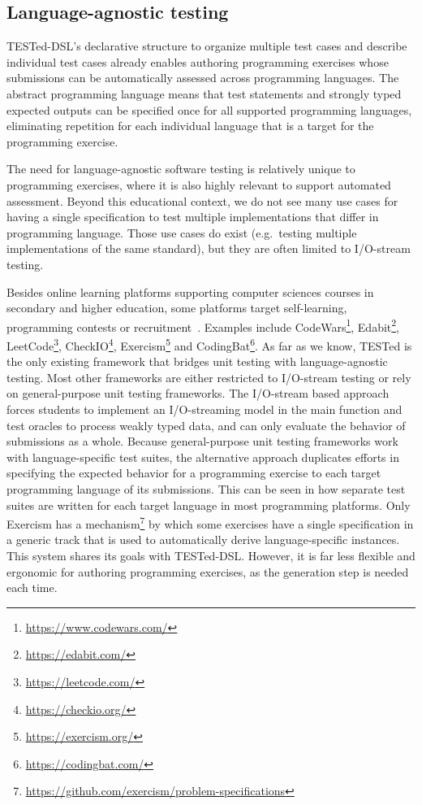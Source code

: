 \documentclass[../main]{subfiles}
\begin{document}
\subsection{Language-agnostic testing}\label{subsec:language-agnostic-testing}

TESTed-DSL's declarative structure to organize multiple test cases and describe individual test cases already enables authoring programming exercises whose submissions can be automatically assessed across programming languages.
The abstract programming language means that test statements and strongly typed expected outputs can be specified once for all supported programming languages, eliminating repetition for each individual language that is a target for the programming exercise.

The need for language-agnostic software testing is relatively unique to programming exercises, where it is also highly relevant to support automated assessment.
Beyond this educational context, we do not see many use cases for having a single specification to test multiple implementations that differ in programming language.
Those use cases do exist (e.g.\ testing multiple implementations of the same standard), but they are often limited to I/O-stream testing.

Besides online learning platforms supporting computer sciences courses in secondary and higher education, some platforms target self-learning, programming contests or recruitment~\autocite{hidalgo-cespedesEvaluationOnlineJudge2023}.
Examples include CodeWars\footnote{\url{https://www.codewars.com/}}, Edabit\footnote{\url{https://edabit.com/}}, LeetCode\footnote{\url{https://leetcode.com/}}, CheckIO\footnote{\url{https://checkio.org/}}, Exercism\footnote{\url{https://exercism.org/}} and CodingBat\footnote{\url{https://codingbat.com/}}.
As far as we know, TESTed is the only existing framework that bridges unit testing with language-agnostic testing.
Most other frameworks are either restricted to I/O-stream testing or rely on general-purpose unit testing frameworks.
The I/O-stream based approach forces students to implement an I/O-streaming model in the main function and test oracles to process weakly typed data, and can only evaluate the behavior of submissions as a whole.
Because general-purpose unit testing frameworks work with language-specific test suites, the alternative approach duplicates efforts in specifying the expected behavior for a programming exercise to each target programming language of its submissions.
This can be seen in how separate test suites are written for each target language in most programming platforms.
Only Exercism has a mechanism\footnote{\url{https://github.com/exercism/problem-specifications}} by which some exercises have a single specification in a generic track that is used to automatically derive language-specific instances.
This system shares its goals with TESTed-DSL\@.
However, it is far less flexible and ergonomic for authoring programming exercises, as the generation step is needed each time.
\end{document}
